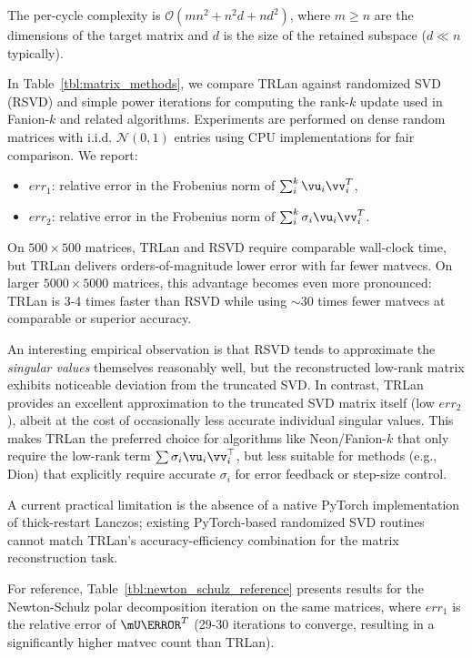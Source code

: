 \documentclass[smallextended,referee,envcountsect]{svjour3}
\newcommand{\tableref}[1]{Table~\ref{#1}}
\begin{document}
 The per-cycle complexity is $\mathcal{O}(mn^2 + n^2d + nd^2)$, where $m \geq n$ are the dimensions of the target matrix and $d$ is the size of the retained subspace ($d \ll n$ typically).
 
 In \tableref{tbl:matrix_methods}, we compare TRLan against randomized SVD (RSVD) and simple power iterations for computing the rank-$k$ update used in Fanion-$k$ and related algorithms. Experiments are performed on dense random matrices with i.i.d. $\mathcal{N}(0,1)$ entries using CPU implementations for fair comparison.
 We report:
 \begin{itemize}
   \item $err_1$: relative error in the Frobenius norm of $\sum_i^k \vu_i \vv_i^T$,
   \item $err_2$: relative error in the Frobenius norm of $\sum_i^k \sigma_i \vu_i \vv_i^T$.
 \end{itemize}
 
 On $500\times500$ matrices, TRLan and RSVD require comparable wall-clock time, but TRLan delivers orders-of-magnitude lower error with far fewer matvecs. On larger $5000\times5000$ matrices, this advantage becomes even more pronounced: TRLan is 3-4 times faster than RSVD while using $\sim$30 times fewer matvecs at comparable or superior accuracy.
 
 An interesting empirical observation is that RSVD tends to approximate the \emph{singular values} themselves reasonably well, but the reconstructed low-rank matrix exhibits noticeable deviation from the truncated SVD. In contrast, TRLan provides an excellent approximation to the truncated SVD matrix itself (low $err_2$), albeit at the cost of occasionally less accurate individual singular values. This makes TRLan the preferred choice for algorithms like Neon/Fanion-$k$ that only require the low-rank term $\sum \sigma_i \vu_i \vv_i^\top$, but less suitable for methods (e.g., Dion) that explicitly require accurate $\sigma_i$ for error feedback or step-size control.
 
 A current practical limitation is the absence of a native PyTorch implementation of thick-restart Lanczos; existing PyTorch-based randomized SVD routines cannot match TRLan's accuracy-efficiency combination for the matrix reconstruction task.
 
 For reference, \tableref{tbl:newton_schulz_reference} presents results for the Newton-Schulz polar decomposition iteration on the same matrices, where $err_1$ is the relative error of $\mU\mV^T$ (29-30 iterations to converge, resulting in a significantly higher matvec count than TRLan).
 
\end{document}
